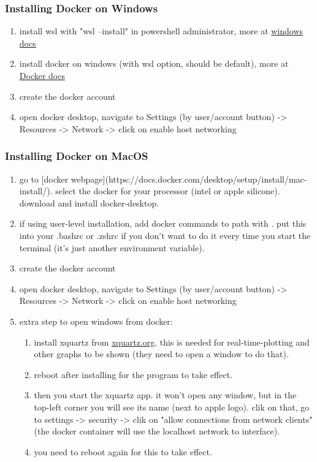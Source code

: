 \subsubsection{Installing Docker on Windows}
\begin{enumerate}
\item install wsl with "wsl --install" in powershell administrator, more at \href{https://learn.microsoft.com/en-us/windows/wsl/install}{windows docs}
\item install docker on windows (with wsl option, should be default), more at \href{https://docs.docker.com/desktop/install/windows-install}{Docker docs}
\item create the docker account 
\item open docker desktop, navigate to Settings (by user/account button) -> Resources -> Network -> click on enable host networking
\end{enumerate}

\subsubsection{Installing Docker on MacOS}
\begin{enumerate}
\item go to [docker webpage](https://docs.docker.com/desktop/setup/install/mac-install/). 
   select the docker for your processor (intel or apple silicone).
   download and install docker-desktop.
\item if using user-level installation, add docker commands to path with 
		\newline
		.
   put this into your .bashrc or .zshrc if you don't want to do it every time you start the terminal (it's just another environment variable).
\item create the docker account 
\item open docker desktop, navigate to Settings (by user/account button) -> Resources -> Network -> click on enable host networking
\item extra step to open windows from docker: 
		\begin{enumerate}
				\item install xquartz from \href{xquartz.org}{xquartz.org}. 
						this is needed for real-time-plotting and 
						other graphs to be shown
   (they need to open a window to do that). 
\item reboot after installing for the program to take effect.
\item   then you start the xquartz app. it won't open any window, but in the top-left corner you will see its name (next to apple logo).
   clik on that, go to settings -> security -> clik on "allow connections from network clients" (the docker container will use the localhost network 
   to interface). 
\item you need to reboot again for this to take effect.
		\end{enumerate}
\end{enumerate}


